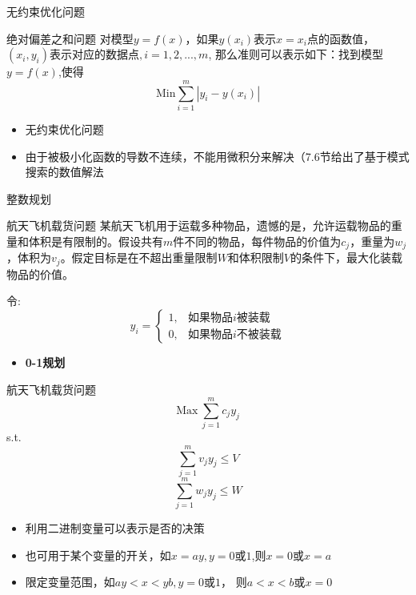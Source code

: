 \documentclass[UTF8]{ctexbeamer}
\begin{document}
\begin{frame}{无约束优化问题}
  \begin{block}{绝对偏差之和问题}
    对模型$y=f(x)$，如果$y(x_i)$表示$x=x_i$点的函数值， $(x_i, y_i)表示对应的数据点, i=1, 2, ..., m$, 那么准则可以表示如下：找到模型$y=f(x)$,使得
    \[
    \mbox{Min} \sum_{i=1}^m |y_i - y(x_i)|
    \]
  \end{block}

  \begin{itemize}
  \item 无约束优化问题
  \item 由于被极小化函数的导数不连续，不能用微积分来解决（7.6节给出了基于模式搜索的数值解法
  \end{itemize}
  
\end{frame}

\begin{frame}{整数规划}
  \begin{block}{航天飞机载货问题}
    某航天飞机用于运载多种物品，遗憾的是，允许运载物品的重量和体积是有限制的。假设共有$m$件不同的物品，每件物品的价值为$c_j$，重量为$w_j$，体积为$v_j$。假定目标是在不超出重量限制$W$和体积限制$V$的条件下，最大化装载物品的价值。
  \end{block}
  令:
  \[
  y_i = \left\{
    \begin{array}{ll}
      1, & \text{如果物品$i$被装载}\\
      0, & \text{如果物品$i$不被装载}
    \end{array}
  \right.
  \]

  \begin{itemize}
  \item \textbf{0-1规划}
  \end{itemize}
\end{frame}

\begin{frame}{航天飞机载货问题}
  \[
  \mbox{Max}\ \sum_{j=1}^m c_jy_j
  \]
  s.t.
  \[
  \sum_{j=1}^m v_jy_j \le V
  \]
  \[
  \sum_{j=1}^m w_jy_j \le W
  \]

  \begin{itemize}
  \item 利用二进制变量可以表示是否的决策
  \item 也可用于某个变量的开关，如$x=ay, y=0\text{或}1$,则$x=0$或$x=a$
  \item 限定变量范围，如$ay < x < yb, y=0\text{或}1$， 则$a<x<b$或$x=0$
  \end{itemize}
  
\end{frame}
\end{document}

